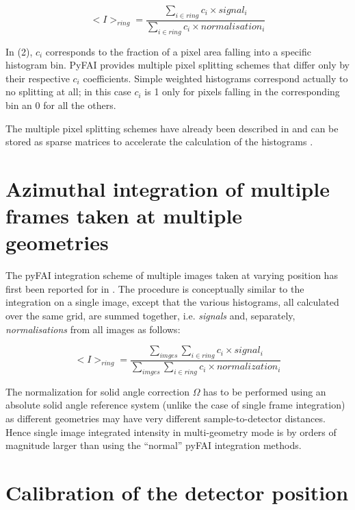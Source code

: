 \documentclass[preprint, pdf]{iucr}              %
\begin{document}
\begin{equation}
<I>_{ring} = \frac{\sum\limits_{i \in ring} c_i \times signal_i}
                  {\sum\limits_{i \in ring} c_i \times normalisation_i} 
\end{equation}

In (2), $c_i$ corresponds to the fraction of a pixel area 
falling into a specific histogram bin. 
PyFAI provides multiple pixel splitting schemes that differ only by their
respective $c_i$ coefficients. 
Simple weighted histograms correspond actually to no splitting at all; in this
case $c_i$ is 1 only for pixels falling in the corresponding bin an 0 for all
the others.
  
The multiple pixel splitting schemes have already been described in
 \cite{fv5028} and can be stored as sparse matrices to accelerate the
 calculation of the histograms  \cite{kieffer_ashiotis-proc-euroscipy-2014}.

\section{Azimuthal integration of multiple frames taken at multiple geometries}

The pyFAI integration scheme of multiple images taken at varying position has
first been reported for  in  \cite{PyFAI_PDJ}. 
The procedure is conceptually similar to the integration on a single image,
except that the various histograms, all calculated over the same
grid, are summed together, i.e. \textit{signals} and, separately, 
\textit{normalisations} from all images as follows: 

\begin{equation}
<I>_{ring} = \frac{\sum\limits_{imges} \sum\limits_{i \in ring} c_i \times
signal_i} {\sum\limits_{imges} \sum\limits_{i \in ring} c_i \times
normalization_i} 
\end{equation}

The normalization for solid angle correction $\Omega$ has to be performed
using an absolute solid angle reference system (unlike the case of single
frame integration) as different geometries may have very different
sample-to-detector distances.
Hence single image integrated intensity in multi-geometry mode is by orders of
magnitude larger than using the ``normal'' pyFAI integration methods.

\section{Calibration of the detector position}
\end{document}
